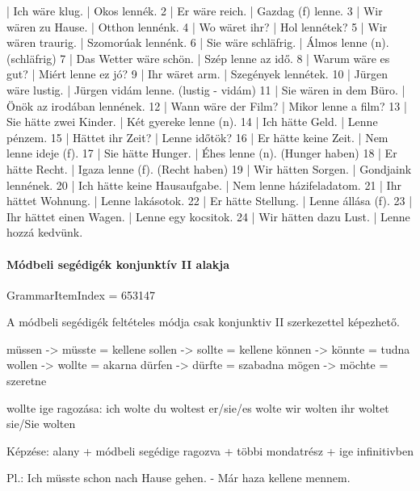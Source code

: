 \documentclass{article}
\newenvironment{desc}{\verbatim}{\endverbatim}
\newenvironment{exmp}{\verbatim}{\endverbatim}
\begin{document}
\begin{exmp}
1 | Ich wäre klug. | Okos lennék.
2 | Er wäre reich. | Gazdag (f) lenne.
3 | Wir wären zu Hause. | Otthon lennénk.
4 | Wo wäret ihr? | Hol lennétek?
5 | Wir wären traurig. | Szomorúak lennénk.
6 | Sie wäre schläfrig. | Álmos lenne (n). (schläfrig)
7 | Das Wetter wäre schön. | Szép lenne az idő.
8 | Warum wäre es gut? | Miért lenne ez jó?
9 | Ihr wäret arm. | Szegények lennétek.
10 | Jürgen wäre lustig. | Jürgen vidám lenne. (lustig - vidám)
11 | Sie wären in dem Büro. | Önök az irodában lennének.
12 | Wann wäre der Film? | Mikor lenne a film?
13 | Sie hätte zwei Kinder. | Két gyereke lenne (n).
14 | Ich hätte Geld. | Lenne pénzem.
15 | Hättet ihr Zeit? | Lenne időtök?
16 | Er hätte keine Zeit. | Nem lenne ideje (f).
17 | Sie hätte Hunger. | Éhes lenne (n). (Hunger haben)
18 | Er hätte Recht. | Igaza lenne (f). (Recht haben)
19 | Wir hätten Sorgen. | Gondjaink lennének.
20 | Ich hätte keine Hausaufgabe. | Nem lenne házifeladatom.
21 | Ihr hättet Wohnung. | Lenne lakásotok.
22 | Er hätte Stellung. | Lenne állása (f).
23 | Ihr hättet einen Wagen. | Lenne egy kocsitok.
24 | Wir hätten dazu Lust. | Lenne hozzá kedvünk.
\end{exmp}

\paragraph{Módbeli segédigék konjunktív II alakja}

GrammarItemIndex = 653147

\begin{desc}
A módbeli segédigék feltételes módja csak konjunktiv II szerkezettel képezhető.

müssen -> müsste = kellene
sollen -> sollte = kellene
können -> könnte = tudna
wollen -> wollte = akarna
dürfen -> dürfte = szabadna
mögen -> möchte = szeretne

wollte ige ragozása:
ich wolte
du woltest
er/sie/es wolte
wir wolten
ihr woltet
sie/Sie wolten

Képzése: alany + módbeli segédige ragozva + többi mondatrész + ige infinitivben

Pl.: Ich müsste schon nach Hause gehen. - Már haza kellene mennem.
\end{desc}
\end{document}
